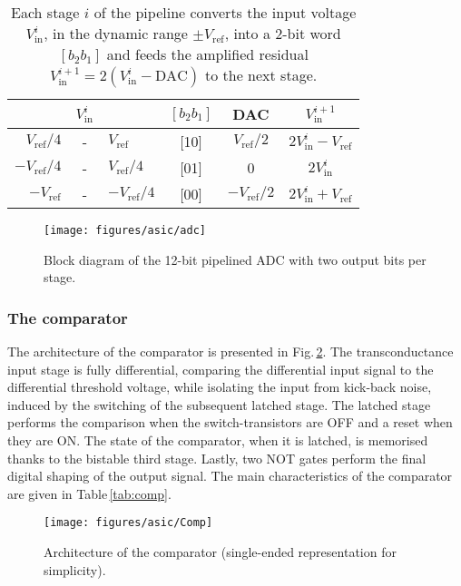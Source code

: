\begin{table}[h]
  \centering
  \begin{tabular}{rcl c c c}
  \toprule
                      & $V_\mathrm{in}^i$  &  & $[b_2b_1]$  & DAC          & $V_\mathrm{in}^{i+1}$\\
  \midrule
  $ V_\mathrm{ref}/4$ &-& $ V_\mathrm{ref}$   & [10] & $V_\mathrm{ref}/2$  & $2V_\mathrm{in}^i - V_\mathrm{ref}$\\
  $-V_\mathrm{ref}/4$ &-& $ V_\mathrm{ref}/4$ & [01] & 0                   & $2V_\mathrm{in}^i$\\
  $-V_\mathrm{ref}$   &-& $-V_\mathrm{ref}/4$ & [00] & $-V_\mathrm{ref}/2$ & $2V_\mathrm{in}^i + V_\mathrm{ref}$\\
  \bottomrule
  \end{tabular}
  \caption{Each stage $i$ of the pipeline converts the input voltage $V_\mathrm{in}^{i}$, in the dynamic range $\pm V_\mathrm{ref}$, 
           into a 2-bit word $[b_2b_1]$ and feeds the amplified residual $V_\mathrm{in}^{i+1}=2(V_\mathrm{in}^i-\mathrm{DAC})$ to the 
           next stage.\label{tab:adc_stage}}
\end{table}

\begin{figure}[tb]
	\centering
	\texttt{[image: figures/asic/adc]}
	\caption{Block diagram of the 12-bit pipelined ADC with two output bits per stage.}
	\label{fig:adc}
\end{figure}

\subsubsection*{The comparator}

The architecture of the comparator is presented in Fig.\,\ref{fig:comp_adc}. The transconductance input stage is fully differential, 
comparing the differential input signal to the differential threshold voltage, while isolating the input from kick-back noise, 
induced by the switching of the subsequent latched stage. The latched stage performs the comparison when the switch-transistors are 
OFF and a reset when they are ON. The state of the comparator, when it is latched, is memorised thanks to the bistable third stage. Lastly, 
two NOT gates perform the final digital shaping of the output signal. The main characteristics of the comparator are given in 
Table\,\ref{tab:comp}.

\begin{figure}[t]
  \centering
  \texttt{[image: figures/asic/Comp]}
  \caption{Architecture of the comparator (single-ended representation for simplicity).}
  \label{fig:comp_adc}
\end{figure}

